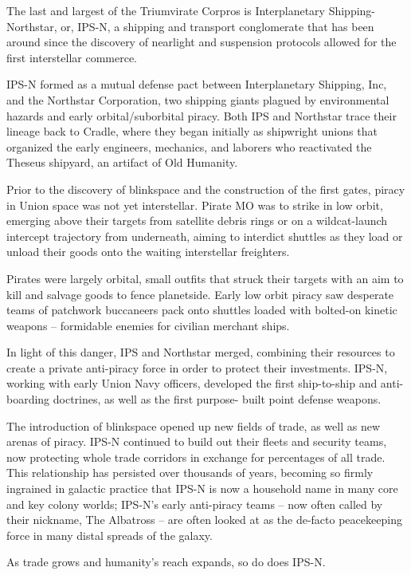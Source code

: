 The last and largest of the Triumvirate Corpros is Interplanetary Shipping-Northstar, or, IPS-N, a
shipping and transport conglomerate that has been around since the discovery of nearlight and
suspension protocols allowed for the first interstellar commerce.

IPS-N formed as a mutual defense pact between Interplanetary Shipping, Inc, and the Northstar
Corporation, two shipping giants plagued by environmental hazards and early orbital/suborbital
piracy. Both IPS and Northstar trace their lineage back to Cradle, where they began initially as
shipwright unions that organized the early engineers, mechanics, and laborers who reactivated
the Theseus shipyard, an artifact of Old Humanity.

Prior to the discovery of blinkspace and the construction of the first gates, piracy in Union space
was not yet interstellar. Pirate MO was to strike in low orbit, emerging above their targets from
satellite debris rings or on a wildcat-launch intercept trajectory from underneath, aiming to interdict
shuttles as they load or unload their goods onto the waiting interstellar freighters.

Pirates were largely orbital, small outfits that struck their targets with an aim to kill and salvage
goods to fence planetside. Early low orbit piracy saw desperate teams of patchwork buccaneers
pack onto shuttles loaded with bolted-on kinetic weapons -- formidable enemies for civilian
merchant ships.

In light of this danger, IPS and Northstar merged, combining their resources to create a private
anti-piracy force in order to protect their investments. IPS-N, working with early Union Navy
officers, developed the first ship-to-ship and anti-boarding doctrines, as well as the first purpose-
built point defense weapons.

The introduction of blinkspace opened up new fields of trade, as well as new arenas of piracy.
IPS-N continued to build out their fleets and security teams, now protecting whole trade corridors
in exchange for percentages of all trade. This relationship has persisted over thousands of years,
becoming so firmly ingrained in galactic practice that IPS-N is now a household name in many
core and key colony worlds; IPS-N’s early anti-piracy teams -- now often called by their nickname,
The Albatross -- are often looked at as the de-facto peacekeeping force in many distal spreads of
the galaxy.

As trade grows and humanity’s reach expands, so do does IPS-N.

